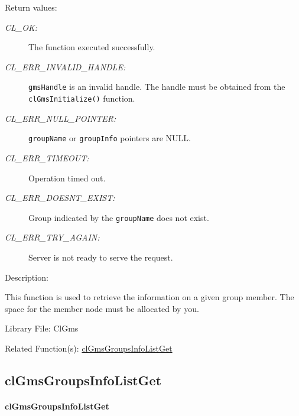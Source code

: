 \begin{flushleft}
\begin{Desc}
\item[Return values:]
\begin{description}
\item[{\em CL\_\-OK:}]The function executed successfully.
\item[{\em CL\_\-ERR\_\-INVALID\_\-HANDLE:}] {\tt{gmsHandle}} is an invalid handle. The handle must be obtained from the
{\tt{clGmsInitialize()}} function. 
 \item[{\em CL\_\-ERR\_\-NULL\_\-POINTER:}] {\tt{groupName}} or {\tt{groupInfo}} pointers are NULL.
  \item[{\em CL\_\-ERR\_\-TIMEOUT:}] Operation timed out.
 \item[{\em CL\_\-ERR\_\-DOESNT\_\-EXIST:}] Group indicated by the {\tt{groupName}} does not exist.
 \item[{\em CL\_\-ERR\_\-TRY\_\-AGAIN:}] Server is not ready to serve the request.
 \end{description}
  \end{Desc}

 \begin{Desc}
 \item[Description:]

  This function is used to retrieve the information on a given group member.
  The space for the member node must be allocated by you.
 \end{Desc}
 \begin{Desc}
\item[Library File:]Cl\-Gms\end{Desc}
\begin{Desc}
  \item[Related Function(s):] \hyperlink{pagegms114}{clGmsGroupsInfoListGet}
  \end{Desc}





\newpage
\subsection{clGmsGroupsInfoListGet}
\hypertarget{pagegms114}{}\paragraph{cl\-Gms\-Groups\-Info\-List\-Get}\label{pagegms114}


\begin{Desc}


\end{Desc}
\end{flushleft}
